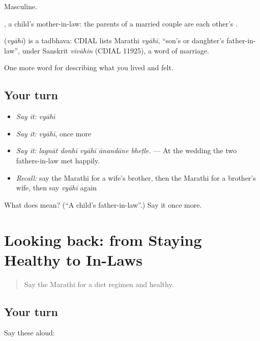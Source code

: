 Masculine.

, a child's mother-in-law: the parents of a married couple are each other's .

\begin{cousinweb}
\textbf{} (\emph{vyāhī}) is a tadbhava: CDIAL lists Marathi \emph{vyāhī}, \textquotedblleft{}son's or daughter's father-in-law\textquotedblright{}, under Sanskrit \emph{vivāhin} (CDIAL 11925), a word of marriage.
\end{cousinweb}

\begin{grammarlens}[title={What you've built}]
One more word for describing what you lived and felt.
\end{grammarlens}

\subsection*{Your turn}
\begin{itemize}
\raggedright
  \item \emph{Say it:} \emph{vyāhī}
  \item \emph{Say it:} \emph{vyāhī}, once more
  \item \emph{Say it:} \emph{lagnāt donhī vyāhī ānandāne bheṭle.} — At the wedding the two fathers-in-law met happily.
  \item \emph{Recall:} say the Marathi for a wife's brother, then the Marathi for a brother's wife, then say \emph{vyāhī} again
\end{itemize}

\begin{tcolorbox}[breakable,colback=teal!4,colframe=teal!35!black,title={Before you move on}]
What does  mean? (\textquotedblleft{}A child's father-in-law\textquotedblright{}.) Say it once more.
\end{tcolorbox}
\section[(dialogue)]{Looking back: from Staying Healthy to In-Laws}

\label{lesson:MR-R496-review-490-496}



\begin{quote}
Say the Marathi for a diet regimen and healthy.
\end{quote}

\subsection*{Your turn}
Say these aloud:


